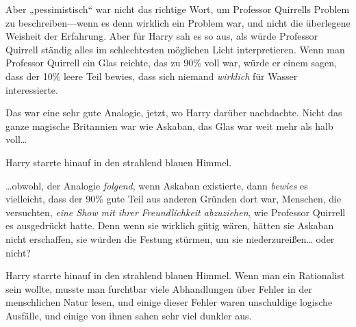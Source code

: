 Aber „pessimistisch“ war nicht das richtige Wort, um Professor Quirrells Problem zu beschreiben—wenn es denn wirklich ein Problem war, und nicht die überlegene Weisheit der Erfahrung. Aber für Harry sah es so aus, als würde Professor Quirrell ständig alles im schlechtesten möglichen Licht interpretieren. Wenn man Professor Quirrell ein Glas reichte, das zu 90\% voll war, würde er einem sagen, dass der 10\% leere Teil bewies, dass sich niemand \emph{wirklich} für Wasser interessierte.

Das war eine sehr gute Analogie, jetzt, wo Harry darüber nachdachte. Nicht das ganze magische Britannien war wie Askaban, das Glas war weit mehr als halb voll…

Harry starrte hinauf in den strahlend blauen Himmel.

…obwohl, der Analogie \emph{folgend}, wenn Askaban existierte, dann \emph{bewies} es vielleicht, dass der 90\% gute Teil aus anderen Gründen dort war, Menschen, die versuchten, \emph{eine Show} \emph{mit ihrer} \emph{Freundlichkeit abzuziehen}, wie Professor Quirrell es ausgedrückt hatte. Denn wenn sie wirklich gütig wären, hätten sie Askaban nicht erschaffen, sie würden die Festung stürmen, um sie niederzureißen… oder nicht?

Harry starrte hinauf in den strahlend blauen Himmel. Wenn man ein Rationalist sein wollte, musste man furchtbar viele Abhandlungen über Fehler in der menschlichen Natur lesen, und einige dieser Fehler waren unschuldige logische Ausfälle, und einige von ihnen sahen sehr viel dunkler aus.

